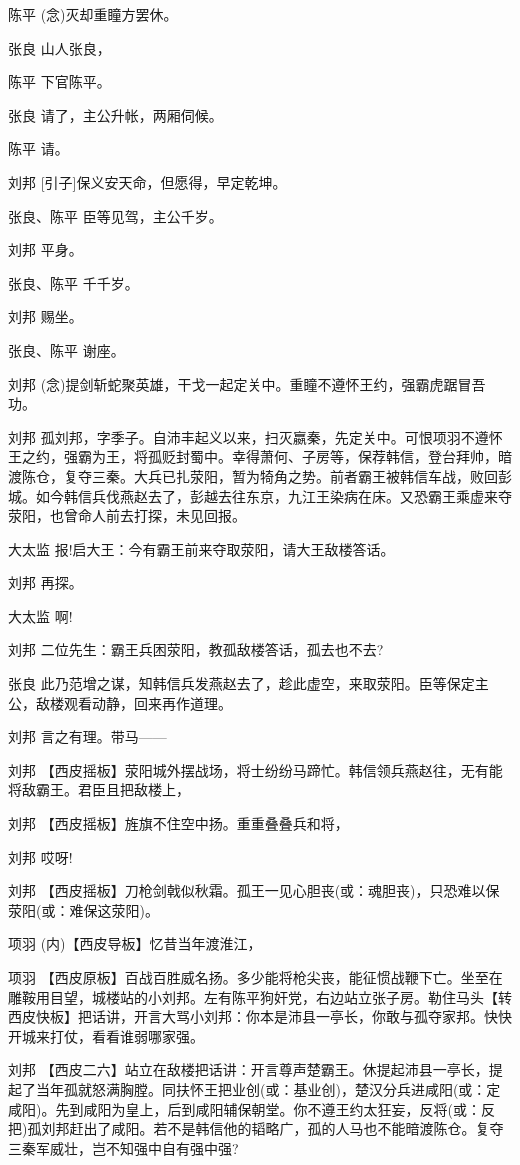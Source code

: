 陈平 (念)灭却重瞳方罢休。

张良 山人张良，

陈平 下官陈平。

张良 请了，主公升帐，两厢伺候。

陈平 请。

刘邦 {[}引子{]}保义安天命，但愿得，早定乾坤。

张良、陈平 臣等见驾，主公千岁。

刘邦 平身。

张良、陈平 千千岁。

刘邦 赐坐。

张良、陈平 谢座。

刘邦
(念)提剑斩蛇聚英雄，干戈一起定关中。重瞳不遵怀王约，强霸虎踞冒吾功。

刘邦
孤刘邦，字季子。自沛丰起义以来，扫灭嬴秦，先定关中。可恨项羽不遵怀王之约，强霸为王，将孤贬封蜀中。幸得萧何、子房等，保荐韩信，登台拜帅，暗渡陈仓，复夺三秦。大兵已扎荥阳，暂为犄角之势。前者霸王被韩信车战，败回彭城。如今韩信兵伐燕赵去了，彭越去往东京，九江王染病在床。又恐霸王乘虚来夺荥阳，也曾命人前去打探，未见回报。

大太监 报!启大王：今有霸王前来夺取荥阳，请大王敌楼答话。

刘邦 再探。

大太监 啊!

刘邦 二位先生：霸王兵困荥阳，教孤敌楼答话，孤去也不去?

张良
此乃范增之谋，知韩信兵发燕赵去了，趁此虚空，来取荥阳。臣等保定主公，敌楼观看动静，回来再作道理。

刘邦 言之有理。带马------

刘邦
【西皮摇板】荥阳城外摆战场，将士纷纷马蹄忙。韩信领兵燕赵往，无有能将敌霸王。君臣且把敌楼上，

刘邦 【西皮摇板】旌旗不住空中扬。重重叠叠兵和将，

刘邦 哎呀!

刘邦
【西皮摇板】刀枪剑戟似秋霜。孤王一见心胆丧(或：魂胆丧)，只恐难以保荥阳(或：难保这荥阳)。

项羽 (内)【西皮导板】忆昔当年渡淮江，

项羽
【西皮原板】百战百胜威名扬。多少能将枪尖丧，能征惯战鞭下亡。坐至在雕鞍用目望，城楼站的小刘邦。左有陈平狗奸党，右边站立张子房。勒住马头【转西皮快板】把话讲，开言大骂小刘邦：你本是沛县一亭长，你敢与孤夺家邦。快快开城来打仗，看看谁弱哪家强。

刘邦
【西皮二六】站立在敌楼把话讲：开言尊声楚霸王。休提起沛县一亭长，提起了当年孤就怒满胸膛。同扶怀王把业创(或：基业创)，楚汉分兵进咸阳(或：定咸阳)。先到咸阳为皇上，后到咸阳辅保朝堂。你不遵王约太狂妄，反将(或：反把)孤刘邦赶出了咸阳。若不是韩信他的韬略广，孤的人马也不能暗渡陈仓。复夺三秦军威壮，岂不知强中自有强中强?

